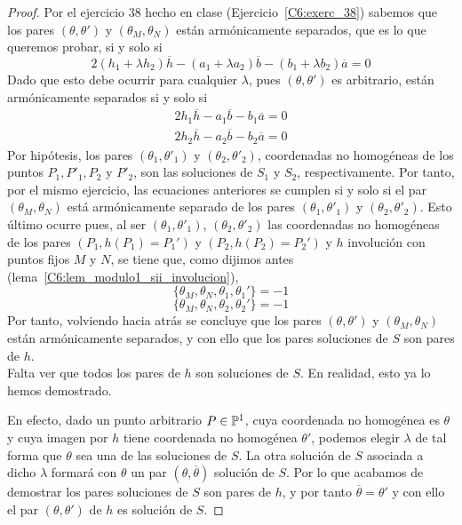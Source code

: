 \begin{proof}
	Por el ejercicio 38 hecho en clase (Ejercicio~\ref{C6:exerc_38}) sabemos que los pares $(\theta,\theta')$ y $(\theta_M,\theta_N)$ están armónicamente separados, que es lo que queremos probar, si y solo si
	\begin{equation*}
		2(h_1+\lambda h_2)\overline{h}-(a_1+\lambda a_2)\overline{b}-(b_1+\lambda b_2)\overline{a}=0
	\end{equation*}
	Dado que esto debe ocurrir para cualquier $\lambda$, pues $(\theta,\theta')$ es arbitrario, están armónicamente separados si y solo si
	\begin{equation*}
		\begin{split}
			2h_1\overline{h}-a_1\overline{b}-b_1\overline{a}=0\\
			2h_2\overline{h}-a_2\overline{b}-b_2\overline{a}=0
		\end{split}
	\end{equation*}
	Por hipótesis, los pares $(\theta_1,\theta'_1)$ y $(\theta_2,\theta'_2)$, coordenadas no homogéneas de los puntos $P_1,P'_1,P_2$ y $P'_2$, son las soluciones de $S_1$ y $S_2$, respectivamente. Por tanto, por el mismo ejercicio, las ecuaciones anteriores se cumplen si y solo si el par $(\theta_M,\theta_N)$ está armónicamente separado de los pares $(\theta_1,\theta'_1)$ y $(\theta_2,\theta'_2)$. Esto último ocurre pues, al ser $(\theta_1,\theta'_1)$, $(\theta_2,\theta'_2)$ las coordenadas no homogéneas de los pares $(P_1,h(P_1)=P_1')$ y $(P_2,h(P_2)=P_2')$ y $h$ involución con puntos fijos $M$ y $N$, se tiene que, como dijimos antes (lema~\ref{C6:lem_modulo1_sii_involucion}),
	\begin{equation*}
		\{\theta_M,\theta_N,\theta_1,\theta_1'\}=-1
	\end{equation*}
	\begin{equation*}
		\{\theta_M,\theta_N,\theta_2,\theta_2'\}=-1
	\end{equation*}
	Por tanto, volviendo hacia atrás se concluye que los pares $(\theta,\theta')$ y $(\theta_M,\theta_N)$ están armónicamente separados, y con ello que los pares soluciones de $S$ son pares de $h$.\\
	
	Falta ver que todos los pares de $h$ son soluciones de $S$. En realidad, esto ya lo hemos demostrado.
	
	En efecto, dado un punto arbitrario $P\in\mathbb{P}^1$, cuya coordenada no homogénea es $\theta$ y cuya imagen por $h$ tiene coordenada no homogénea $\theta'$, podemos elegir $\lambda$ de tal forma que $\theta$ sea una de las soluciones de $S$. La otra solución de $S$ asociada a dicho $\lambda$ formará con $\theta$ un par $(\theta,\overline{\theta})$ solución de $S$. Por lo que acabamos de demostrar los pares soluciones de $S$ son pares de $h$, y por tanto $\overline{\theta}=\theta'$ y con ello el par $(\theta,\theta')$ de $h$ es solución de $S$.
\end{proof}
